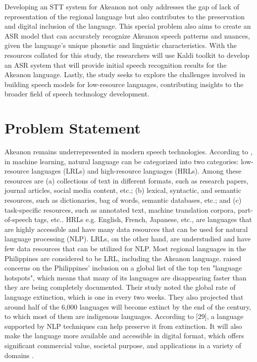 Developing an STT system for Akeanon not only addresses the gap of lack of representation of the regional language but also contributes to the preservation and digital inclusion of the language. This special problem also aims to create an ASR model that can accurately recognize Akeanon speech patterns and nuances, given the language’s unique phonetic and linguistic characteristics. With the resources collated for this study, the researchers will use Kaldi toolkit to develop an ASR system that will provide initial speech recognition results for the Akeanon language. Lastly, the study seeks to explore the challenges involved in building speech models for low-resource languages, contributing insights to the broader field of speech technology development.


\section{Problem Statement}
\label{sec:problemstatement}

Akeanon remains underrepresented in modern speech technologies. According to , in machine learning, natural language can be categorized into two categories: low-resource languages (LRLs) and high-resource languages (HRLs). Among these resources are (a) collections of text in different formats, such as research papers, journal articles, social media content, etc.; (b) lexical, syntactic, and semantic resources, such as dictionaries, bag of words, semantic databases, etc.; and (c) task-specific resources, such as annotated text, machine translation corpora, part-of-speech tags, etc.. HRLs e.g. English, French, Japanese, etc., are languages that are highly accessible and have many data resources that can be used for natural language processing (NLP). LRLs, on the other hand, are understudied and have few data resources that can be utilized for NLP.  Most regional languages in the Philippines are considered to be LRL, including the Akeanon language.  raised concerns on the Philippines' inclusion on a global list of the top ten "language hotspots", which means that many of its languages are disappearing faster than they are being completely documented. Their study noted the global rate of language extinction, which is one in every two weeks. They also projected that around half of the 6,000 languages will become extinct by the end of the century, to which most of them are indigenous languages. According to  [29], a language supported by NLP techniques can help preserve it from extinction. It will also make the language more available and accessible in digital format, which offers significant commercial value, societal purpose, and applications in a variety of domains \cite{Tsvetkov:2017}.


